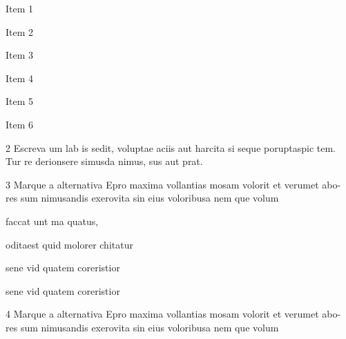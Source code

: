 \begin{boxlist}
    \item Item 1  

    \item Item 2

    \item Item 3

    \item Item 4

    \item Item 5

    \item Item 6
\end{boxlist}

\num{2} Escreva um lab is sedit, voluptae aciis aut harcita si seque poruptaspic tem.
Tur re derionsere simusda nimus, sus aut prat.

\linhas


\num{3} Marque a alternativa Epro maxima vollantias mosam volorit et verumet abo-
res sum nimusandis exerovita sin eius voloribusa nem que volum

\begin{escolha}
\item faccat unt ma quatus,

\item oditaest quid molorer chitatur  

\item sene vid quatem coreristior

\item sene vid quatem coreristior
\end{escolha}

\num{4} Marque a alternativa Epro maxima vollantias mosam volorit et verumet abo-
res sum nimusandis exerovita sin eius voloribusa nem que volum


\begin{multicols}{2}






\end{multicols}

